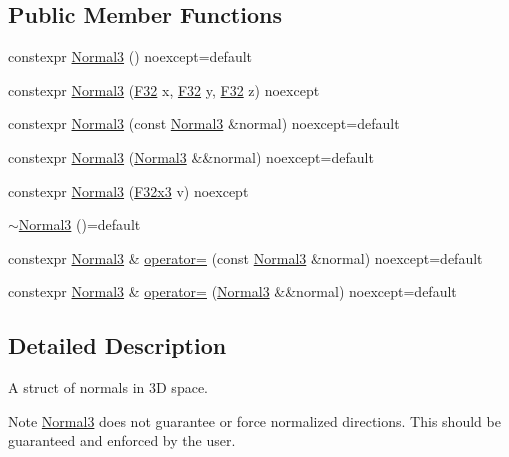 \subsection*{Public Member Functions}
\begin{DoxyCompactItemize}
\item 
constexpr \mbox{\hyperlink{structmage_1_1_normal3_a31cd202f6cda288c0b4702e232007b39}{Normal3}} () noexcept=default
\item 
constexpr \mbox{\hyperlink{structmage_1_1_normal3_a7ff657d4eea97a894d0ee7ad3cb02a16}{Normal3}} (\mbox{\hyperlink{namespacemage_aa97e833b45f06d60a0a9c4fc22ae02c0}{F32}} x, \mbox{\hyperlink{namespacemage_aa97e833b45f06d60a0a9c4fc22ae02c0}{F32}} y, \mbox{\hyperlink{namespacemage_aa97e833b45f06d60a0a9c4fc22ae02c0}{F32}} z) noexcept
\item 
constexpr \mbox{\hyperlink{structmage_1_1_normal3_ae85b31999c0f2b3f63fd854275a9ef85}{Normal3}} (const \mbox{\hyperlink{structmage_1_1_normal3}{Normal3}} \&normal) noexcept=default
\item 
constexpr \mbox{\hyperlink{structmage_1_1_normal3_a2f0bf2d017db9e1e7e214d3a9a849764}{Normal3}} (\mbox{\hyperlink{structmage_1_1_normal3}{Normal3}} \&\&normal) noexcept=default
\item 
constexpr \mbox{\hyperlink{structmage_1_1_normal3_aefed0af318bd76295b614153e75c3846}{Normal3}} (\mbox{\hyperlink{namespacemage_a0fef5ab4e073c2d9ea876fefa3da4233}{F32x3}} v) noexcept
\item 
\mbox{\hyperlink{structmage_1_1_normal3_a3384b2970fd85fe729514ce0686b4446}{$\sim$\+Normal3}} ()=default
\item 
constexpr \mbox{\hyperlink{structmage_1_1_normal3}{Normal3}} \& \mbox{\hyperlink{structmage_1_1_normal3_aeeb43d61c914bc975c22e059b8bbeec9}{operator=}} (const \mbox{\hyperlink{structmage_1_1_normal3}{Normal3}} \&normal) noexcept=default
\item 
constexpr \mbox{\hyperlink{structmage_1_1_normal3}{Normal3}} \& \mbox{\hyperlink{structmage_1_1_normal3_a59aca1c2a1eb936c36bce64b4b5936b9}{operator=}} (\mbox{\hyperlink{structmage_1_1_normal3}{Normal3}} \&\&normal) noexcept=default
\end{DoxyCompactItemize}


\subsection{Detailed Description}
A struct of normals in 3D space.

\begin{DoxyNote}{Note}
{\ttfamily \mbox{\hyperlink{structmage_1_1_normal3}{Normal3}}} does not guarantee or force normalized directions. This should be guaranteed and enforced by the user. 
\end{DoxyNote}


